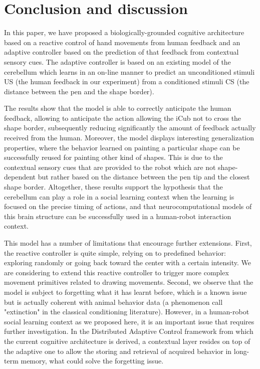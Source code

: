 \documentclass[letterpaper, 10 pt, conference]{ieeeconf}  %
\begin{document}
\section{Conclusion and discussion}

In this paper, we have proposed a biologically-grounded cognitive architecture based on a reactive control of hand movements from human feedback and an adaptive controller based on the prediction of that feedback from contextual sensory cues. The adaptive controller is based on an existing model of the cerebellum which learns in an on-line manner to predict an unconditioned stimuli US (the human feedback in our experiment) from a conditioned stimuli CS (the distance between the pen and the shape border). 

The results show that the model is able to correctly anticipate the human feedback, allowing to anticipate the action allowing the iCub not to cross the shape border, subsequently reducing significantly the amount of feedback actually received from the human. Moreover, the model displays interesting generalization properties, where the behavior learned on painting a particular shape can be successfully reused for painting other kind of shapes. This is due to the contextual sensory cues that are provided to the robot which are not shape-dependent but rather based on the distance between the pen tip and the closest shape border. Altogether, these results support the hypothesis that the cerebellum can play a role in a social learning context when the learning is focused on the precise timing of actions, and that neurocomputational models of this brain structure can be successfully used in a human-robot interaction context.

This model has a number of limitations that encourage further extensions. First, the reactive controller is quite simple, relying on to predefined behavior: exploring randomly or going back toward the center with a certain intensity. We are considering to extend this reactive controller to trigger more complex movement primitives related to drawing movements.  Second, we observe that the model is subject to forgetting what it has learnt before, which is a known issue but is actually coherent with animal behavior data (a phenomenon call "extinction" in the classical conditioning literature). However, in a human-robot social learning context as we proposed here, it is an important issue that requires further investigation. In the Distributed Adaptive Control framework from which the current cognitive architecture is derived, a contextual layer resides on top of the adaptive one to allow the storing and retrieval of acquired behavior in long-term memory, what could solve the forgetting issue.
\end{document}
